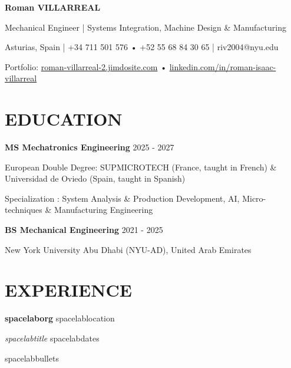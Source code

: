 \documentclass[10pt,a4paper]{article}
\newcommand{\jobOne}{spacelab}
\newcommand{\get}[2]{\csname #1#2\endcsname}
\begin{document}
\small

\begin{center}
{\LARGE\bfseries Roman VILLARREAL}

\vspace{2pt}
Mechanical Engineer | Systems Integration, Machine Design \& Manufacturing

Asturias, Spain | +34 711 501 576 • +52 55 68 84 30 65 | riv2004@nyu.edu

Portfolio:
\href{https://roman-villarreal-2.jimdosite.com/}{roman-villarreal-2.jimdosite.com} • 
\href{https://www.linkedin.com/in/roman-isaac-villarreal/}{linkedin.com/in/roman-isaac-villarreal}
\end{center}
\section*{EDUCATION}

\textbf{MS Mechatronics Engineering} \hfill 2025 - 2027

European Double Degree: SUPMICROTECH (France, taught in French) \& Universidad de Oviedo (Spain, taught in Spanish)

Specialization : System Analysis \& Production Development, AI, Micro-techniques \& Manufacturing Engineering

\vspace{4pt}

\textbf{BS Mechanical Engineering} \hfill 2021 - 2025

New York University Abu Dhabi (NYU-AD), United Arab Emirates

\vspace{2pt}

\hrulefill 
\section*{EXPERIENCE}

\textbf{\get{\jobOne}{org}} \hfill \get{\jobOne}{location}

\textit{\get{\jobOne}{title}} \hfill \get{\jobOne}{dates}

\begin{itemize}
    \get{\jobOne}{bullets}
\end{itemize}
\end{document}
